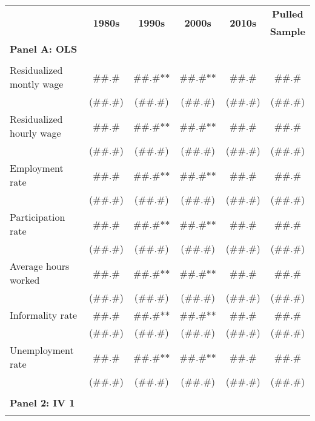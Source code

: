 \begin{tabular}{rccccc}
\toprule
      & \multirow{2}[2]{*}{\textbf{1980s}} & \multirow{2}[2]{*}{\textbf{1990s}} & \multirow{2}[2]{*}{\textbf{2000s}} & \multirow{2}[2]{*}{\textbf{2010s}} & \textbf{Pulled} \\
      &       &       &       &       & \textbf{Sample} \\
\cmidrule{2-6}\multicolumn{1}{l}{\textbf{Panel A: OLS}} &       &       &       &       &  \\
      &       &       &       &       &  \\
\multicolumn{1}{l}{Residualized montly wage} & \#\#.\# & \#\#.\#** & \#\#.\#** & \#\#.\# & \#\#.\# \\
      & (\#\#.\#) & (\#\#.\#) & (\#\#.\#) & (\#\#.\#) & (\#\#.\#) \\
\multicolumn{1}{l}{Residualized hourly wage} & \#\#.\# & \#\#.\#** & \#\#.\#** & \#\#.\# & \#\#.\# \\
      & (\#\#.\#) & (\#\#.\#) & (\#\#.\#) & (\#\#.\#) & (\#\#.\#) \\
\multicolumn{1}{l}{Employment rate} & \#\#.\# & \#\#.\#** & \#\#.\#** & \#\#.\# & \#\#.\# \\
      & (\#\#.\#) & (\#\#.\#) & (\#\#.\#) & (\#\#.\#) & (\#\#.\#) \\
\multicolumn{1}{l}{Participation rate} & \#\#.\# & \#\#.\#** & \#\#.\#** & \#\#.\# & \#\#.\# \\
      & (\#\#.\#) & (\#\#.\#) & (\#\#.\#) & (\#\#.\#) & (\#\#.\#) \\
\multicolumn{1}{l}{Average hours worked} & \#\#.\# & \#\#.\#** & \#\#.\#** & \#\#.\# & \#\#.\# \\
      & (\#\#.\#) & (\#\#.\#) & (\#\#.\#) & (\#\#.\#) & (\#\#.\#) \\
\multicolumn{1}{l}{Informality rate} & \#\#.\# & \#\#.\#** & \#\#.\#** & \#\#.\# & \#\#.\# \\
      & (\#\#.\#) & (\#\#.\#) & (\#\#.\#) & (\#\#.\#) & (\#\#.\#) \\
\multicolumn{1}{l}{Unemployment rate} & \#\#.\# & \#\#.\#** & \#\#.\#** & \#\#.\# & \#\#.\# \\
      & (\#\#.\#) & (\#\#.\#) & (\#\#.\#) & (\#\#.\#) & (\#\#.\#) \\
      &       &       &       &       &  \\
\multicolumn{1}{l}{\textbf{Panel 2: IV 1}} &       &       &       &       &  \\
      &       &       &       &       &  \\

\end{tabular}
